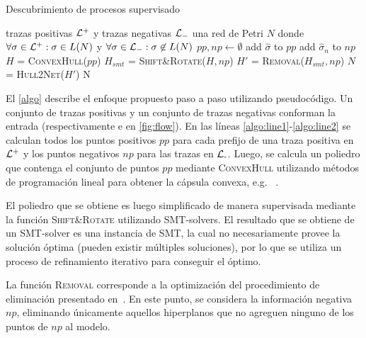 \begin{algorithm}[H]
\caption{Descubrimiento de procesos supervisado}
  \begin{algorithmic}[1]
      \Require trazas positivas ${\mathcal L}^+$ y trazas negativas ${\mathcal L}_-$
      \Ensure una red de Petri $N$ donde $\forall \sigma \in {\mathcal L}^+: \sigma \in L(N)$ y $\forall \sigma \in {\mathcal L}_-: \sigma \not \in L(N)$
      \vspace{1pt}
      \State $pp, np \leftarrow \emptyset$ \label{algo:line1}
          \State add $\widehat\sigma$ to $pp$
       \EndFor
     \EndFor
        \State add $\widehat\sigma_n$ to $np$
      \EndFor \label{algo:line2}
      \State $H$ = \textsc{ConvexHull}($pp$) \label{algo:lineqhull}
      \State $H_{smt}$ = \textsc{Shift\&Rotate}($H, np$)
      \State $H'$ = \textsc{Removal}($H_{smt}, np$)
      \State $N$ = \textsc{Hull2Net}($H'$)
      \State \Return N
      \EndProcedure
  \end{algorithmic}
  \label{algo}
\end{algorithm}

El \autoref{algo} describe el enfoque propuesto paso a paso utilizando pseudocódigo. Un conjunto de trazas 
positivas y un conjunto de trazas negativas conforman la entrada 
(respectivamente  e  en \autoref{fig:flow}). 
En las líneas \ref{algo:line1}-\ref{algo:line2} se calculan todos los puntos positivos $pp$ para
cada prefijo de una traza positiva en ${\mathcal L}\textsuperscript{+}$ y los puntos negativos $np$ para las trazas en ${\mathcal L}\textsubscript{-}$\footnotemark[1].
Luego, se calcula un poliedro que contenga el conjunto de puntos $pp$ mediante \textsc{ConvexHull} utilizando 
métodos de programación lineal para obtener la cápsula convexa, e.g. \qhulltool~\cite{Barber96}.

El poliedro que se obtiene es luego simplificado de manera supervisada mediante la función 
\textsc{Shift\&Rotate} utilizando SMT-solvers. El resultado que se obtiene de un SMT-solver es 
una instancia de SMT, la cual no necesariamente provee la solución óptima (pueden existir múltiples soluciones), 
por lo que se utiliza un proceso de refinamiento iterativo para conseguir el óptimo.

La función \textsc{Removal} corresponde a la optimización del procedimiento de eliminación presentado en~\cite{LeonCB15}.
En este punto, se considera la información negativa $np$, eliminando únicamente aquellos hiperplanos
que no agreguen ninguno de los puntos de $np$ al modelo.

